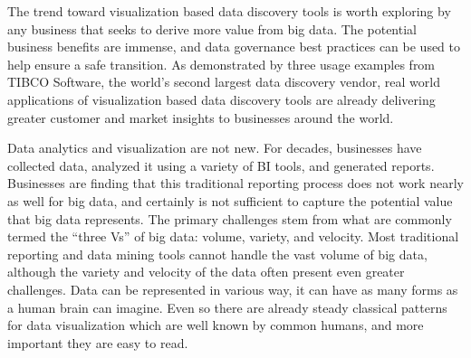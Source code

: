 The trend toward visualization based data discovery tools is worth exploring by any business that seeks to derive more value from big data. The potential business benefits are immense, and data governance best practices can be used to help ensure a safe transition. As demonstrated by three usage examples from TIBCO Software, the world’s second largest data discovery vendor, real world applications of visualization based data discovery tools are already delivering greater customer and market insights to businesses around the world.

Data analytics and visualization are not new. For decades, businesses have collected data, analyzed it using a variety of BI tools, and generated reports. Businesses are finding that this traditional reporting process does not work nearly as well for big data, and certainly is not sufficient to capture the potential value that big data represents. The primary challenges stem from what are commonly termed the “three Vs” of big data: volume, variety, and velocity. Most traditional reporting and data mining tools cannot handle the vast volume of big data, although the variety and velocity of the data often present even greater challenges. Data can be represented in various way, it can have as many forms as a human brain can imagine. Even so there are already steady classical patterns for data visualization which are well known by common humans, and more important they are easy to read.

